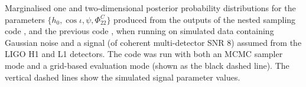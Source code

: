 \label{fig:simsignal_multi}
Marginalised one and two-dimensional posterior probability distributions
for the parameters $\{h_0, \cos{\iota}, \psi, \Phi_{22}^C\}$
produced from the outputs of the nested sampling code \lppen, and the previous
code \lppe, when running on simulated data containing Gaussian noise and a signal 
(of coherent multi-detector SNR 8) assumed from the LIGO H1 and L1 detectors. The \lppe code was run with both an MCMC sampler mode and a grid-based
evaluation mode (shown as the black dashed line). The vertical dashed lines show the simulated signal parameter values.
